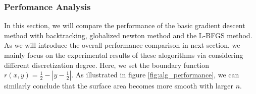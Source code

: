 \subsubsection{Perfomance Analysis}

In this section, we will compare the performance of the basic gradient descent method with backtracking, globalized newton method and the L-BFGS method. As we will introduce the overall performance comparison in next section, we mainly focus on the experimental results of these alogorithms via considering different discretization degree. Here, we set the boundary function $r(x, y)=\frac{1}{2}-\left|y-\frac{1}{2}\right|$. As illustrated in figure \ref{fig:alg_performance}, we can similarly conclude that the surface area becomes more smooth with larger $n$.
\begin{figure}[!htbp]
    \centering
\end{figure}

